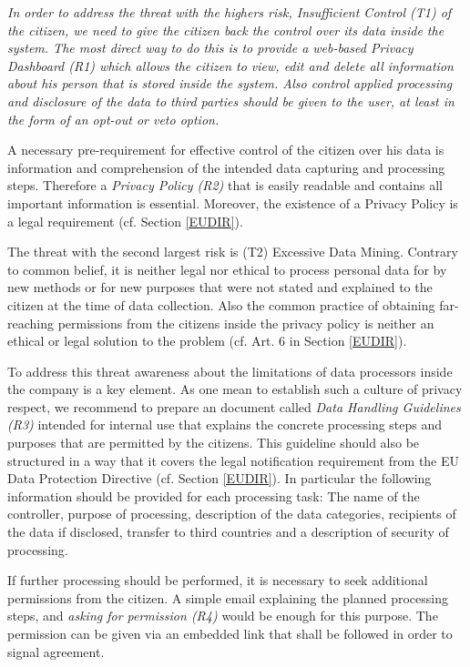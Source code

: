 \documentclass[runningheads,a4paper]{llncs}
\newenvironment{LGContent}
{ \par\color{blue} \it \small }
{ \par }
\begin{document}
\begin{LGContent}
In order to address the threat with the highers risk, Insufficient
Control (T1) of the citizen, we need to give the citizen back the
control over its data inside the system. The most direct way to do
this is to provide a web-based \emph{Privacy Dashboard (R1)} which allows
the citizen to view, edit and delete all information about his person
that is stored inside the system. Also control applied processing and
disclosure of the data to third parties should be given to the user,
at least in the form of an opt-out or veto option.

A necessary pre-requirement for effective control of the citizen over
his data is information and comprehension of the intended data
capturing and processing steps. Therefore a \emph{Privacy Policy (R2)} that
is easily readable and contains all important information is
essential.  Moreover, the existence of a Privacy Policy is a legal
requirement (cf. Section \ref{EUDIR}).

The threat with the second largest risk is (T2) Excessive Data Mining.
Contrary to common belief, it is neither legal nor ethical to process
personal data for by new methods or for new purposes that were not
stated and explained to the citizen at the time of data
collection. Also the common practice of obtaining far-reaching
permissions from the citizens inside the privacy policy is neither an
ethical or legal solution to the problem (cf. Art. 6 in Section
\ref{EUDIR}).

To address this threat awareness about the limitations of data
processors inside the company is a key element. As one mean to
establish such a culture of privacy respect, we recommend to prepare
an document called \emph{Data Handling Guidelines (R3)} intended for
internal use that explains the concrete processing steps and purposes
that are permitted by the citizens. This guideline should also be
structured in a way that it covers the legal notification requirement
from the EU Data Protection Directive (cf. Section \ref{EUDIR}). In
particular the following information should be provided for each
processing task: The name of the controller, purpose of processing,
description of the data categories, recipients of the data if
disclosed, transfer to third countries and a description of security
of processing.

If further processing should be performed, it is necessary to seek
additional permissions from the citizen. A simple email explaining the
planned processing steps, and \emph{asking for permission (R4)} would be
enough for this purpose. The permission can be given via an embedded
link that shall be followed in order to signal agreement.


\end{LGContent}
\end{document}
